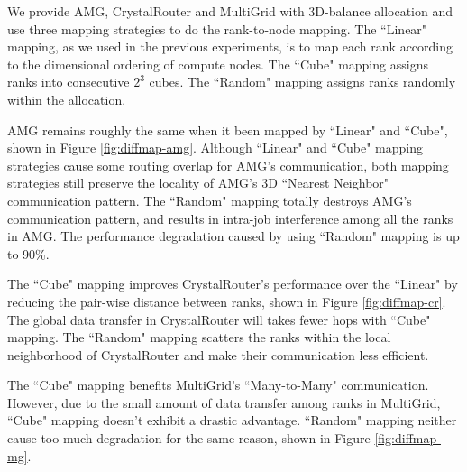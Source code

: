 We provide AMG, CrystalRouter and MultiGrid with 3D-balance allocation and use three mapping strategies to do the rank-to-node mapping. The ``Linear" mapping, as we used in the previous experiments, is to map each rank according to the dimensional ordering of compute nodes. The ``Cube" mapping assigns ranks into consecutive $2^{3}$ cubes. The ``Random" mapping assigns ranks randomly within the allocation. 

AMG remains roughly the same when it been mapped by ``Linear" and ``Cube", shown in Figure \ref{fig:diffmap-amg}. Although ``Linear" and ``Cube" mapping strategies cause some routing overlap for AMG's communication, both mapping strategies still preserve the locality of AMG's 3D ``Nearest Neighbor" communication pattern. The ``Random" mapping totally destroys AMG's communication pattern, and results in intra-job interference among all the ranks in AMG. The performance degradation caused by using ``Random" mapping is up to 90\%.

The ``Cube" mapping improves CrystalRouter's performance over the ``Linear" by reducing the pair-wise distance between ranks, shown in Figure \ref{fig:diffmap-cr}. The global data transfer in CrystalRouter will takes fewer hops with ``Cube" mapping. The ``Random" mapping scatters the ranks within the local neighborhood of CrystalRouter and make their communication less efficient. 


The ``Cube" mapping benefits MultiGrid's ``Many-to-Many" communication. However, due to the small amount of data transfer among ranks in MultiGrid, ``Cube" mapping doesn't exhibit a drastic advantage. ``Random" mapping neither cause too much degradation for the same reason, shown in Figure \ref{fig:diffmap-mg}.


